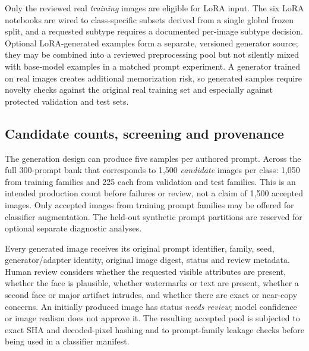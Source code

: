 Only the reviewed real \emph{training} images are eligible for LoRA input. The six LoRA notebooks are wired to class-specific subsets derived from a single global frozen split, and a requested subtype requires a documented per-image subtype decision. Optional LoRA-generated examples form a separate, versioned generator source; they may be combined into a reviewed preprocessing pool but not silently mixed with base-model examples in a matched prompt experiment. A generator trained on real images creates additional memorization risk, so generated samples require novelty checks against the original real training set and especially against protected validation and test sets.

\subsection{Candidate counts, screening and provenance}
The generation design can produce five samples per authored prompt. Across the full 300-prompt bank that corresponds to 1,500 \emph{candidate} images per class: 1,050 from training families and 225 each from validation and test families. This is an intended production count before failures or review, not a claim of 1,500 accepted images. Only accepted images from training prompt families may be offered for classifier augmentation. The held-out synthetic prompt partitions are reserved for optional separate diagnostic analyses.

Every generated image receives its original prompt identifier, family, seed, generator/adapter identity, original image digest, status and review metadata. Human review considers whether the requested visible attributes are present, whether the face is plausible, whether watermarks or text are present, whether a second face or major artifact intrudes, and whether there are exact or near-copy concerns. An initially produced image has status \emph{needs review}; model confidence or image realism does not approve it. The resulting accepted pool is subjected to exact SHA and decoded-pixel hashing and to prompt-family leakage checks before being used in a classifier manifest.

